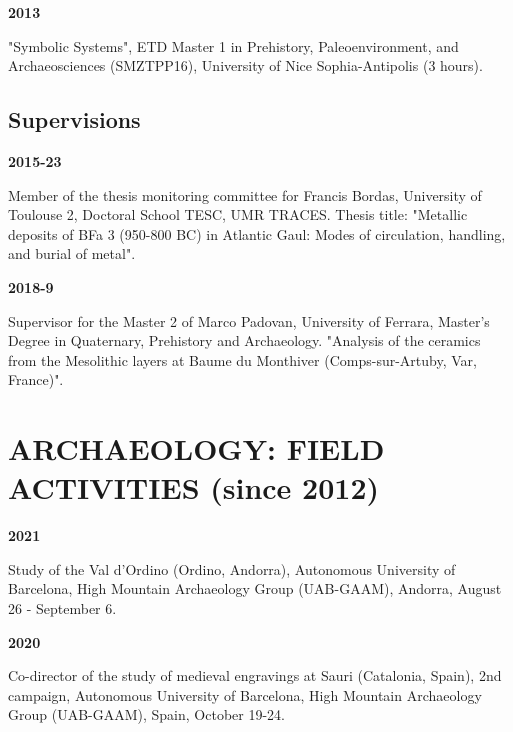 \documentclass{article}
\newcommand{\fr}[1]{} %
\newcommand{\en}[1]{#1}   %
\begin{document}
\smallbreak
\textbf{2013}
\fr{"Systèmes symboliques", ETD Master 1 Préhistoire, Paléoenvironnement et Archéosciences (SMZTPP16), Université Nice Sophia-Antipolis (3 heures).}
\en{"Symbolic Systems", ETD Master 1 in Prehistory, Paleoenvironment, and Archaeosciences (SMZTPP16), University of Nice Sophia-Antipolis (3 hours).}

\subsection*{\fr{Encadrements}\en{Supervisions}}

\textbf{2015-23}
\fr{Membre du comité de suivi de la thèse de Francis Bordas, Université Toulouse 2, École doctorale TESC, UMR TRACES. Titre de la thèse : "Les dépôts métalliques du BFa 3 (950-800 av. J.-C.) en Gaule atlantique Modalités de circulation, de manipulation et d’enfouissement du métal".}
\en{Member of the thesis monitoring committee for Francis Bordas, University of Toulouse 2, Doctoral School TESC, UMR TRACES. Thesis title: "Metallic deposits of BFa 3 (950-800 BC) in Atlantic Gaul: Modes of circulation, handling, and burial of metal".}

\smallbreak
\textbf{2018-9}
\fr{Tuteur du Master 2 de Marco Padovan, Università degli Studi di Ferrara, Corso di Laurea Magistrale in Quaternario, Preistoria e Archeologia. "Analyse de la céramique des couches mésolithiques à Baume du Monthiver (Comps-sur-Artuby, Var, France)".}
\en{Supervisor for the Master 2 of Marco Padovan, University of Ferrara, Master's Degree in Quaternary, Prehistory and Archaeology. "Analysis of the ceramics from the Mesolithic layers at Baume du Monthiver (Comps-sur-Artuby, Var, France)".}

\section*{\fr{ARCHÉOLOGIE: ACTIVITÉS DE TERRAIN (depuis 2012)}\en{ARCHAEOLOGY: FIELD ACTIVITIES (since 2012)}}

\textbf{2021}
\fr{Étude du Val d'Ordino (Ordino, Andorre), Universitat Autònoma de Barcelona, Grup d'Arqueologia de l'Alta Muntanya (UAB-GAAM), Andorre, 26 août-6 septembre.}
\en{Study of the Val d'Ordino (Ordino, Andorra), Autonomous University of Barcelona, High Mountain Archaeology Group (UAB-GAAM), Andorra, August 26 - September 6.}

\smallbreak
\textbf{2020}
\fr{Co-responsable de l'étude des gravures médiévales de Sauri (Catalogne, Espagne), 2ème campagne, Universitat Autònoma de Barcelona, Grup d'Arqueologia de l'Alta Muntanya (UAB-GAAM), Espagne, 19 octobre-24 octobre.}
\en{Co-director of the study of medieval engravings at Sauri (Catalonia, Spain), 2nd campaign, Autonomous University of Barcelona, High Mountain Archaeology Group (UAB-GAAM), Spain, October 19-24.}
\end{document}
